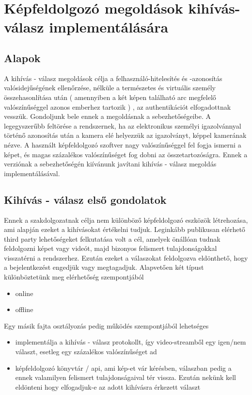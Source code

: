 \section{Képfeldolgozó megoldások kihívás-válasz implementálására}
\subsection{Alapok}
A kihívás - válasz megoldások célja a felhasználó-hitelesítés és -azonosítás valósidejűségének ellenőrzése, nélküle a természetes és virtuális személy összehasonlítása után ( amennyiben a két képen található arc megfelelő valószínűséggel azonos emberhez tartozik ) , az authentikációt elfogadottnak vesszük.
Gondoljunk bele ennek a megoldásnak a sebezhetőségeibe. A legegyszerűbb feltörése a rendszernek, ha az elektronikus személyi igazolvánnyal történő azonosítás után a kamera elé helyezzük az igazolványt, képpel kamerának nézve. A használt képfeldolgozó szoftver nagy valószínűséggel fel fogja ismerni a képet, és magas százalékos valószínűséget fog dobni az összetartozóságra. Ennek a verziónak a sebezhetőségén kiívánunk javítani kihívás - válasz megoldás implementálásával.
\subsection{Kihívás - válasz első gondolatok}
Ennek a szakdolgozatnak célja nem különböző képfeldolgozó eszközök létrehozása, ami alapján ezeket a kihívásokat értékelni tudjuk. Leginkább publikusan elérhető third party lehetőségeket felkutatása volt a cél, amelyek önállóan tudnak feldolgozni képet vagy videót, majd bizonyos felismert tulajdonságokkal visszatérni a rendszerhez. Ezután ezeket a válaszokat feldolgozva eldönthető, hogy a bejelentkezést engedjük vagy megtagadjuk.
Alapvetően két típust különböztetünk meg elérhetőség szempontjából
\begin{itemize}
\item online
\item offline
\end{itemize}
Egy másik fajta osztályozás pedig működés szempontjából lehetséges
\begin{itemize}
\item implementálja a kihívás - válasz protokollt, így video-streamből egy igen/nem választ, esetleg egy százalékos valószínűséget ad
\item képfeldolgozó könyvtár / api, ami kép-et vár kérésben, válaszban pedig a ennek valamilyen felismert tulajdonságaival tér vissza. Ezután nekünk kell eldönteni hogy elfogadjuk-e az adott kihívásra érkezett választ
\end{itemize}

